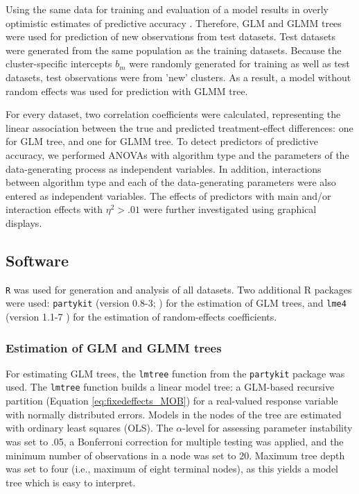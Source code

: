 \documentclass[nobf,doc]{apa}
\begin{document}
Using the same data for training and evaluation of a model results in overly optimistic estimates of predictive accuracy \cite{HastyTibs09}. Therefore, GLM and GLMM trees were used for prediction of new observations from test datasets. Test datasets were generated from the same population as the training datasets. Because the cluster-specific intercepts $b_m$ were randomly generated for training as well as test datasets, test observations were from 'new' clusters. As a result, a model without random effects was used for prediction with GLMM tree.

For every dataset, two correlation coefficients were calculated, representing the linear association between the true and predicted treatment-effect differences: one for GLM tree, and one for GLMM tree. To detect predictors of predictive accuracy, we performed ANOVAs with algorithm type and the parameters of the data-generating process as independent variables. In addition, interactions between algorithm type and each of the data-generating parameters were also entered as independent variables. The effects of predictors with main and/or interaction effects with $\eta^2 > .01$ were further investigated using graphical displays.


\subsection{Software}

\verb|R| \cite{R14} was used for generation and analysis of all datasets. Two additional R packages were used: \verb|partykit| (version 0.8-3; ) for the estimation of GLM trees, and \verb|lme4| (version 1.1-7 ) for the estimation of random-effects coefficients. 


\subsubsection{Estimation of GLM and GLMM trees}

For estimating GLM trees, the \verb|lmtree| function from the \verb|partykit| package was used. The \verb|lmtree| function builds a linear model tree: a GLM-based recursive partition (Equation \ref{eq:fixedeffects_MOB}) for a real-valued response variable with normally distributed errors. Models in the nodes of the tree are estimated with ordinary least squares (OLS). The $\alpha$-level for assessing parameter instability was set to .05, a Bonferroni correction for multiple testing was applied, and the minimum number of observations in a node was set to 20. Maximum tree depth was set to four (i.e., maximum of eight terminal nodes), as this yields a model tree which is easy to interpret. 
\end{document}

